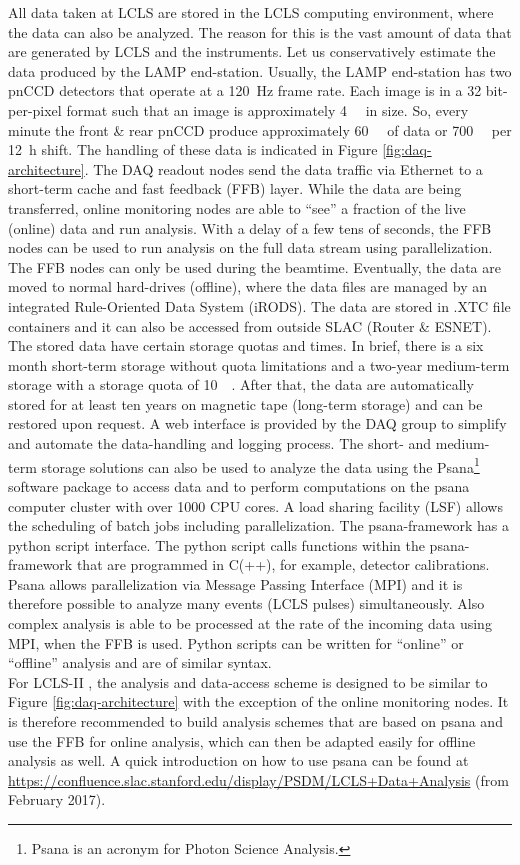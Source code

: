 All data taken at LCLS are stored in the LCLS computing environment, where the data can also be analyzed. The reason for this is the vast amount of data that are generated by LCLS and the instruments. Let us conservatively estimate the data produced by the LAMP end-station. Usually, the LAMP end-station has two pnCCD detectors that operate at a \SI{120}{\hertz} frame rate. Each image is in a 32 bit-per-pixel format such that an image is approximately \SI{4}{\mega\byte} in size. So, every minute the front \& rear pnCCD produce approximately \SI{60}{\giga\byte} of data or \SI{700}{\giga\byte} per \SI{12}{\hour} shift. The handling of these data is indicated in Figure \ref{fig:daq-architecture}. The DAQ readout nodes send the data traffic via Ethernet to a short-term cache and fast feedback (FFB) layer. While the data are being transferred, online monitoring nodes are able to ``see'' a fraction of the live (online) data and run analysis. With a delay of a few tens of seconds, the FFB nodes can be used to run analysis on the full data stream using parallelization. The FFB nodes can only be used during the beamtime. Eventually, the data are moved to normal hard-drives (offline), where the data files are managed by an integrated Rule-Oriented Data System (iRODS). The data are stored in .XTC file containers and it can also be accessed from outside SLAC (Router \& ESNET). The stored data have certain storage quotas and times. In brief, there is a six month short-term storage without quota limitations and a two-year medium-term storage with a storage quota of \SI{10}{\tera\byte}. After that, the data are automatically stored for at least ten years on magnetic tape (long-term storage) and can be restored upon request. A web interface is provided by the DAQ group to simplify and automate the data-handling and logging process. The short- and medium-term storage solutions can also be used to analyze the data using the Psana\footnote{Psana is an acronym for Photon Science Analysis.} software package \citep{Damiani-2016-JSR} to access data and to perform computations on the psana computer cluster with over 1000 CPU cores. A load sharing facility (LSF) allows the scheduling of batch jobs including parallelization. The psana-framework has a python script interface. The python script calls functions within the psana-framework that are programmed in C(++), for example, detector calibrations. Psana allows parallelization via Message Passing Interface (MPI) and it is therefore possible to analyze many events (LCLS pulses) simultaneously. Also complex analysis is able to be processed at the rate of the incoming data using MPI, when the FFB is used. Python scripts can be written for ``online'' or ``offline'' analysis and are of similar syntax.\\[1\baselineskip]
%
For LCLS-II \citep{Amadeo-2016-SLAC}, the analysis and data-access scheme is designed to be similar to Figure \ref{fig:daq-architecture} with the exception of the online monitoring nodes. It is therefore recommended to build analysis schemes that are based on psana and use the FFB for online analysis, which can then be adapted easily for offline analysis as well. A quick introduction on how to use psana can be found at \url{https://confluence.slac.stanford.edu/display/PSDM/LCLS+Data+Analysis} (from February 2017).
%
%
%
